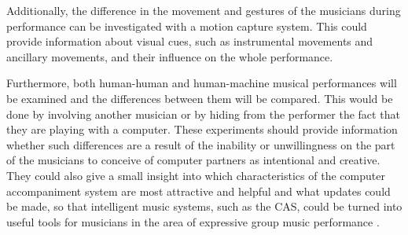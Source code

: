 \documentclass[12pt]{scrartcl}
\begin{document}
Additionally, the difference in the movement and gestures of the musicians during performance can be investigated with a motion capture system. This could provide information about visual cues, such as instrumental movements and ancillary movements, and their influence on the whole performance. 

Furthermore, both human-human and human-machine musical performances will be examined and the differences between them will be compared. This would be done by involving another musician or by hiding from the performer the fact that they are playing with a computer. These experiments should provide information whether such differences are a result of the inability or unwillingness on the part of the musicians to conceive of computer partners as intentional and creative. They could also give a small insight into which characteristics of the computer accompaniment system are most attractive and helpful and what updates could be made, so that intelligent music systems, such as the CAS, could be turned into useful tools for musicians in the area of expressive group music performance \citep{manifesto}. 
\end{document}
